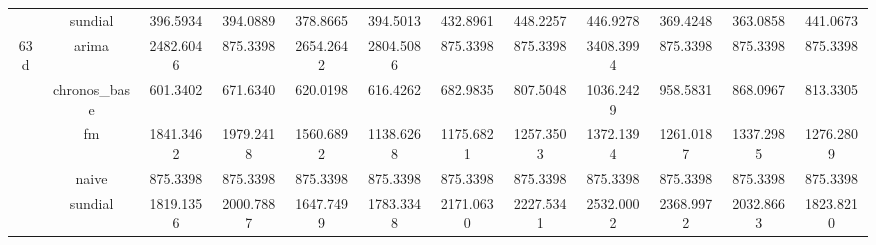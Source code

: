 \begin{table}[H]
{\begin{tabular}{cccccccccccc}
 & sundial & 396.5934 & 394.0889 & 378.8665 & 394.5013 & 432.8961 & 448.2257 & 446.9278 & 369.4248 & 363.0858 & 441.0673 \\
\multirow[c]{5}{*}{63d} & arima & 2482.6046 & 875.3398 & 2654.2642 & 2804.5086 & 875.3398 & 875.3398 & 3408.3994 & 875.3398 & 875.3398 & 875.3398 \\
 & chronos_base & 601.3402 & 671.6340 & 620.0198 & 616.4262 & 682.9835 & 807.5048 & 1036.2429 & 958.5831 & 868.0967 & 813.3305 \\
 & fm & 1841.3462 & 1979.2418 & 1560.6892 & 1138.6268 & 1175.6821 & 1257.3503 & 1372.1394 & 1261.0187 & 1337.2985 & 1276.2809 \\
 & naive & 875.3398 & 875.3398 & 875.3398 & 875.3398 & 875.3398 & 875.3398 & 875.3398 & 875.3398 & 875.3398 & 875.3398 \\
 & sundial & 1819.1356 & 2000.7887 & 1647.7499 & 1783.3348 & 2171.0630 & 2227.5341 & 2532.0002 & 2368.9972 & 2032.8663 & 1823.8210 \\
\bottomrule
\end{tabular}

 }
\end{table}